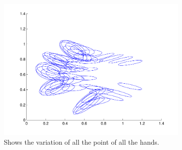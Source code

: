 \begin{figure}[!htbp]
  \centering
  \includegraphics[width=0.85\textwidth]{./images/q31_3}
  \caption{Shows the variation of all the point of all the hands.}
  \label{fig:q31allpoints}
\end{figure}

